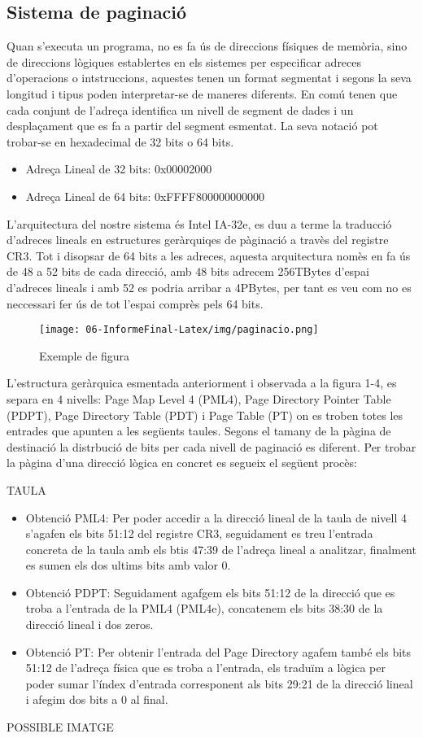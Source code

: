 ﻿\documentclass[10pt,a4paper,twocolumn,twoside]{article}
\begin{document}
\subsection{Sistema de paginació}
Quan s’executa un programa, no es fa ús de direccions físiques de memòria, sino de direccions lògiques establertes en els sistemes per especificar adreces d’operacions o intstruccions, aquestes tenen un format segmentat i segons la seva longitud i tipus poden interpretar-se de maneres diferents. En comú tenen que cada conjunt de l’adreça identifica un nivell de segment de dades i un desplaçament que es fa a partir del segment esmentat. La seva notació pot trobar-se en hexadecimal de 32 bits o 64 bits.
\begin{itemize}
\item Adreça Lineal de 32 bits: 0x00002000
\item Adreça Lineal de 64 bits: 0xFFFF800000000000
\end{itemize}

L’arquitectura del nostre sistema és Intel IA-32e, es duu a terme la traducció d’adreces lineals en estructures geràrquiqes de pàginació a travès del registre CR3. Tot i disopsar de 64 bits a les adreces, aquesta arquitectura nomès en fa ús de 48 a 52 bits de cada direcció, amb 48 bits adrecem 256TBytes d’espai d’adreces lineals i amb 52 es podria arribar a 4PBytes, per tant es veu com no es neccessari fer ús de tot l’espai comprès pels 64 bits.

\begin{figure}[!h]
\centering
	\texttt{[image: 06-InformeFinal-Latex/img/paginacio.png]}
	\caption{Exemple de figura}
	\label{NivellsPaginacio}
\end{figure}


L’estructura geràrquica esmentada anteriorment i observada a la figura 1-4, es separa en 4 nivells: Page Map Level 4 (PML4), Page Directory Pointer Table (PDPT), Page Directory Table (PDT) i Page Table (PT) on es troben totes les entrades que apunten a les següents taules. Segons el tamany de la pàgina de destinació la distrbució de bits per cada nivell de paginació es diferent. Per trobar la pàgina d’una direcció lògica en concret es segueix el següent procès:

TAULA

\begin{itemize}
\item Obtenció PML4: Per poder accedir a la direcció lineal de la taula de nivell 4 s’agafen els bits 51:12 del registre CR3, seguidament es treu l’entrada concreta de la taula amb els btis 47:39 de l’adreça lineal a analitzar, finalment es sumen els dos ultims bits amb valor 0.
\item Obtenció PDPT: Seguidament agafgem els bits 51:12 de la direcció que es troba a l’entrada de la PML4 (PML4e), concatenem els bits 38:30 de la direcció lineal i dos zeros.
\item Obtenció PT: Per obtenir l’entrada del Page Directory agafem també els bits 51:12 de l’adreça física que es troba a l’entrada, els traduïm a lògica per poder sumar l’índex d’entrada corresponent als bits 29:21 de la direcció lineal i afegim dos bits a 0 al final.
\end{itemize}
POSSIBLE IMATGE
\end{document}
